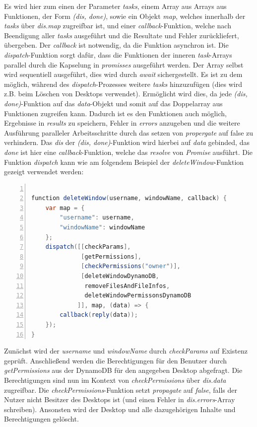 \documentclass[a4paper, 12pt]{scrreprt}
\renewcommand\_{\textunderscore\allowbreak}
\begin{document}
Es wird hier zum einen der Parameter \textit{tasks}, einem Array aus Arrays aus Funktionen, der Form \textit{(dis, done)}, sowie ein Objekt \textit{map}, welches innerhalb der \textit{tasks} über \textit{dis.map} zugreifbar ist, und einer \textit{callback}-Funktion, welche nach Beendigung aller \textit{tasks} ausgeführt und die Resultate und Fehler zurückliefert, übergeben. Der \textit{callback} ist notwendig, da die Funktion asynchron ist. Die \textit{dispatch}-Funktion sorgt dafür, dass die Funktionen der inneren \textit{task}-Arrays parallel durch die Kapselung in \textit{promisses} ausgeführt werden. Der Array selbst wird sequentiell ausgeführt, dies wird durch \textit{await} sichergestellt. Es ist zu dem möglich, während des \textit{dispatch}-Prozesses weitere \textit{tasks} hinzuzufügen (dies wird z.B. beim Löschen von Desktops verwendet). Ermöglicht wird dies, da jede \textit{(dis, done)}-Funktion auf das \textit{data}-Objekt und somit auf das Doppelarray aus Funktionen zugreifen kann. Dadurch ist es den Funktionen auch möglich, Ergebnisse in \textit{results} zu speichern, Fehler in \textit{errors} anzugeben und die weitere Ausführung paralleler Arbeitsschritte durch das setzen von \textit{propergate} auf false zu verhindern. Das \textit{dis} der \textit{(dis, done)}-Funktion wird hierbei auf \textit{data} gebinded, das \textit{done} ist hier eine \textit{callback}-Funktion, welche das \textit{resolve} von \textit{Promise} ausführt. Die Funktion \textit{dispatch} kann wie am folgendem Beispiel der \textit{deleteWindow}-Funktion gezeigt verwendet werden:

\begin{lstlisting}[xleftmargin=\parindent,numbers=left,numberstyle=\small,numbersep=8pt,frame=L,mathescape=true, basicstyle=\small, language=Java]

function deleteWindow(username, windowName, callback) {
    var map = { 
        "username": username, 
        "windowName": windowName
    };
    dispatch([[checkParams], 
              [getPermissions], 
              [checkPermissions("owner")], 
              [deleteWindowDynamoDB, 
               removeFilesAndFileInfos, 
               deleteWindowPermissonsDynamoDB
             ]], map, (data) => {
        callback(reply(data));
    });
}
\end{lstlisting}

\noindent Zunächst wird der \textit{username} und \textit{windowName} durch \textit{checkParams} auf Existenz geprüft. Anschließend werden die Berechtigungen für den Benutzer durch \textit{getPermissions} aus der DynamoDB für den angegeben Desktop abgefragt. Die Berechtigungen sind nun im Kontext von \textit{checkPermissions} über \textit{dis.data} zugreifbar. Die \textit{checkPermissions}-Funktion setzt \textit{propagate} auf \textit{false}, falls der Nutzer nicht Besitzer des Desktops ist (und einen Fehler in \textit{dis.errors}-Array schreiben). Ansonsten wird der Desktop und alle dazugehörigen Inhalte und Berechtigungen gelöscht.    
\end{document}
